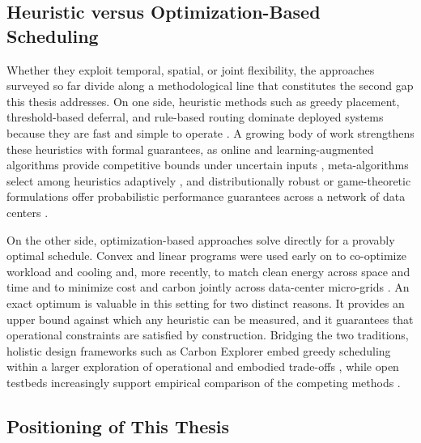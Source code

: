 \subsection{Heuristic versus Optimization-Based Scheduling}
\label{sec:lr-methods}

Whether they exploit temporal, spatial, or joint flexibility, the approaches surveyed so far divide along a methodological line that constitutes the second gap this thesis addresses. On one side, heuristic methods such as greedy placement, threshold-based deferral, and rule-based routing dominate deployed systems because they are fast and simple to operate \citep{radovanovic2023, acun2023carbonexplorer, wijayawardana2025scheduling}. A growing body of work strengthens these heuristics with formal guarantees, as online and learning-augmented algorithms provide competitive bounds under uncertain inputs \citep{lechowicz2025stclip, bostandoost2024lacs}, meta-algorithms select among heuristics adaptively \citep{bostandoost2025datasched}, and distributionally robust or game-theoretic formulations offer probabilistic performance guarantees across a network of data centers \citep{hall2024probabilistic, breukelman2024hierarchical}.

On the other side, optimization-based approaches solve directly for a provably optimal schedule. Convex and linear programs were used early on to co-optimize workload and cooling \citep{liu2012} and, more recently, to match clean energy across space and time \citep{riepin2024spatiotemporal} and to minimize cost and carbon jointly across data-center micro-grids \citep{hao2024joint}. An exact optimum is valuable in this setting for two distinct reasons. It provides an upper bound against which any heuristic can be measured, and it guarantees that operational constraints are satisfied by construction. Bridging the two traditions, holistic design frameworks such as Carbon Explorer embed greedy scheduling within a larger exploration of operational and embodied trade-offs \citep{acun2023carbonexplorer}, while open testbeds increasingly support empirical comparison of the competing methods \citep{wiesner2024vessim}.

\subsection{Positioning of This Thesis}
\label{sec:lr-position}

